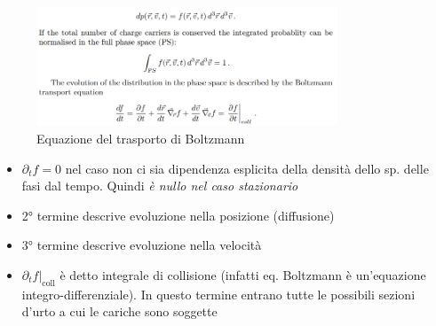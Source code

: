 \begin{figure}[H]
    \centering
    \includegraphics[width=0.8\textwidth,frame]{Chapters/images/Interazione_radiazione_materia/image-20220222095029391.png}
    \captionsetup{width=0.8\linewidth}
    \caption{Equazione del trasporto di Boltzmann}
    \label{fig:boltzmann}
\end{figure}
\begin{remark}[Commenti]
\hfill
\begin{itemize}
    \item $\partial_t f=0$ nel caso non ci sia dipendenza esplicita della densità dello sp. delle fasi dal tempo. 
  Quindi \textit{è nullo nel caso stazionario}

\item 2° termine descrive evoluzione nella posizione (diffusione)

\item 3° termine descrive evoluzione nella velocità

\item $\partial_tf|_\text{coll}$ è detto integrale di collisione (infatti eq. Boltzmann è un'equazione integro-differenziale). In questo termine entrano tutte le possibili sezioni d'urto a cui le cariche sono soggette
\end{itemize}


\end{remark}

